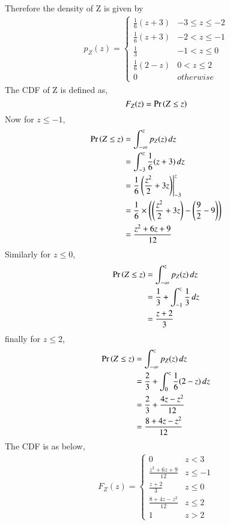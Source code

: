 \documentclass[journal,12pt,twocolumn]{IEEEtran}
\begin{document}
Therefore the density of Z is given by
\begin{align}
\label{eq:pdf_z}
p_{Z}(z)  = 
\begin{cases}
\frac{1}{6}(z+3) & -3 \le z \le -2
\\
\frac{1}{6}(z+3) & -2 < z \le -1
\\
\frac{1}{3} & -1 < z \le 0
\\
\frac{1}{6}(2-z) & 0 < z \le 2
\\
0 & otherwise
\end{cases}
\end{align}
The CDF of Z is defined as,
\begin{equation}
    F_Z(z) = \Pr\left(Z \le z\right)
\end{equation}
Now for $ z \le -1 $,
\begin{align}
    \Pr\left(Z\le z\right) &=  \int_{-\infty}^{z}p_{Z}(z) \,dz  \\
          &=  \int_{-3}^{z} \dfrac{1}{6}(z+3) \,dz  \\
          &= \dfrac{1}{6} \left(\dfrac{z^2}{2}+3z \right) \Biggr|_{-3}^{z}  \\
          &=  \dfrac{1}{6} \times \left(\left(\dfrac{z^2}{2}+3z \right) - \left(\dfrac{9}{2} -9 \right)\right) \\
          &= \dfrac{z^2+6z + 9}{12} 
\end{align}
Similarly for $z \le 0$,
\begin{align}
    \Pr\left(Z\le z\right) &=  \int_{-\infty}^{z}p_{Z}(z) \,dz  \\
          &=  \dfrac{1}{3} + \int_{-1}^{z} \dfrac{1}{3} \,dz  \\
          &= \dfrac{z+2}{3} 
\end{align}
finally for $z \le 2$,
\begin{align}
    \Pr\left(Z\le z\right) &=  \int_{-\infty}^{z}p_{Z}(z) \,dz  \\
          &= \dfrac{2}{3} + \int_{0}^{z} \dfrac{1}{6}(2-z) \,dz  \\
         & =  \dfrac{2}{3} +\dfrac{4z- z^2}{12} \\
         & = \dfrac{8 +4z -z^2}{12} 
\end{align}
The CDF is as below, 
\begin{align}
\label{eq:cdf_z}
F_{Z}(z)  = 
\begin{cases}
0 & z < 3
\\
\frac{z^2+6z + 9}{12} &  z \le -1
\\
\frac{z+2}{3} &  z \le 0
\\
\frac{8 +4z -z^2}{12} & z \le 2
\\
1 & z > 2
\end{cases}
\end{align}
\end{document}
